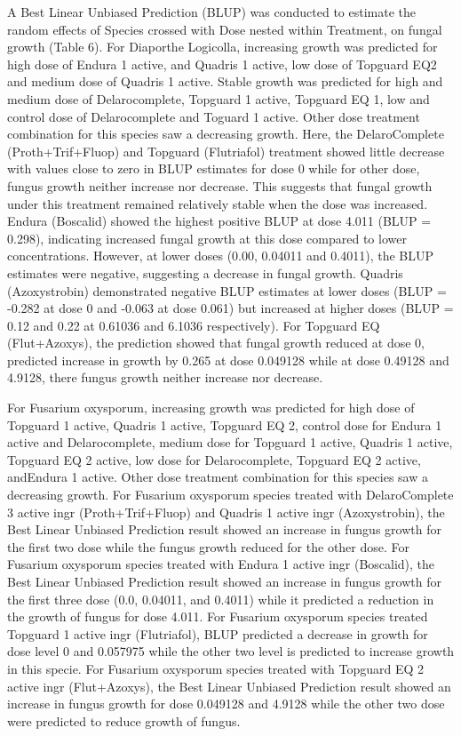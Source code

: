 \documentclass[
  10pt,
  letterpaper,
  twocolumn]{article}
\begin{document}
A Best Linear Unbiased Prediction (BLUP) was conducted to estimate the
random effects of Species crossed with Dose nested within Treatment, on
fungal growth (Table 6). For Diaporthe Logicolla, increasing growth was
predicted for high dose of Endura 1 active, and Quadris 1 active, low
dose of Topguard EQ2 and medium dose of Quadris 1 active. Stable growth
was predicted for high and medium dose of Delarocomplete, Topguard 1
active, Topguard EQ 1, low and control dose of Delarocomplete and
Toguard 1 active. Other dose treatment combination for this species saw
a decreasing growth. Here, the DelaroComplete (Proth+Trif+Fluop) and
Topguard (Flutriafol) treatment showed little decrease with values close
to zero in BLUP estimates for dose 0 while for other dose, fungus growth
neither increase nor decrease. This suggests that fungal growth under
this treatment remained relatively stable when the dose was increased.
Endura (Boscalid) showed the highest positive BLUP at dose 4.011 (BLUP =
0.298), indicating increased fungal growth at this dose compared to
lower concentrations. However, at lower doses (0.00, 0.04011 and
0.4011), the BLUP estimates were negative, suggesting a decrease in
fungal growth. Quadris (Azoxystrobin) demonstrated negative BLUP
estimates at lower doses (BLUP = -0.282 at dose 0 and -0.063 at dose
0.061) but increased at higher doses (BLUP = 0.12 and 0.22 at 0.61036
and 6.1036 respectively). For Topguard EQ (Flut+Azoxys), the prediction
showed that fungal growth reduced at dose 0, predicted increase in
growth by 0.265 at dose 0.049128 while at dose 0.49128 and 4.9128, there
fungus growth neither increase nor decrease.

For Fusarium oxysporum, increasing growth was predicted for high dose of
Topguard 1 active, Quadris 1 active, Topguard EQ 2, control dose for
Endura 1 active and Delarocomplete, medium dose for Topguard 1 active,
Quadris 1 active, Topguard EQ 2 active, low dose for Delarocomplete,
Topguard EQ 2 active, andEndura 1 active. Other dose treatment
combination for this species saw a decreasing growth. For Fusarium
oxysporum species treated with DelaroComplete 3 active ingr
(Proth+Trif+Fluop) and Quadris 1 active ingr (Azoxystrobin), the Best
Linear Unbiased Prediction result showed an increase in fungus growth
for the first two dose while the fungus growth reduced for the other
dose. For Fusarium oxysporum species treated with Endura 1 active ingr
(Boscalid), the Best Linear Unbiased Prediction result showed an
increase in fungus growth for the first three dose (0.0, 0.04011, and
0.4011) while it predicted a reduction in the growth of fungus for dose
4.011. For Fusarium oxysporum species treated Topguard 1 active ingr
(Flutriafol), BLUP predicted a decrease in growth for dose level 0 and
0.057975 while the other two level is predicted to increase growth in
this specie. For Fusarium oxysporum species treated with Topguard EQ 2
active ingr (Flut+Azoxys), the Best Linear Unbiased Prediction result
showed an increase in fungus growth for dose 0.049128 and 4.9128 while
the other two dose were predicted to reduce growth of fungus.
\end{document}
